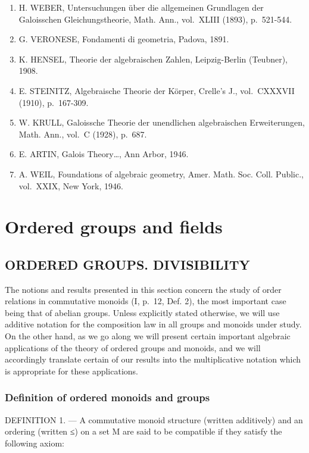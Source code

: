 \begin{enumerate}
\item
  H. WEBER, Untersuchungen über die allgemeinen Grundlagen der Galoisschen Gleichungstheorie, Math. Ann., vol.~XLIII (1893), p.~521-544.
\item
  G. VERONESE, Fondamenti di geometria, Padova, 1891.
\item
  K. HENSEL, Theorie der algebraischen Zahlen, Leipzig-Berlin (Teubner), 1908.
\item
  E. STEINITZ, Algebraische Theorie der Körper, Crelle's J., vol.~CXXXVII (1910), p.~167-309.
\item
  W. KRULL, Galoissche Theorie der unendlichen algebraischen Erweiterungen, Math. Ann., vol.~C (1928), p.~687.
\item
  E. ARTIN, Galois Theory\ldots, Ann Arbor, 1946.
\item
  A. WEIL, Foundations of algebraic geometry, Amer. Math. Soc. Coll. Public., vol.~XXIX, New York, 1946.
\end{enumerate}

\chapter{Ordered groups and fields}

\section{ORDERED GROUPS. DIVISIBILITY}

The notions and results presented in this section concern the study of order relations in commutative monoids (I, p.~12, Def. 2), the most important case being that of abelian groups. Unless explicitly stated otherwise, we will use additive notation for the composition law in all groups and monoids under study. On the other hand, as we go along we will present certain important algebraic applications of the theory of ordered groups and monoids, and we will accordingly translate certain of our results into the multiplicative notation which is appropriate for these applications.

\subsection{Definition of ordered monoids and groups}

DEFINITION 1. --- A commutative monoid structure (written additively) and an ordering (written ≤) on a set M are said to be compatible if they satisfy the following axiom:

